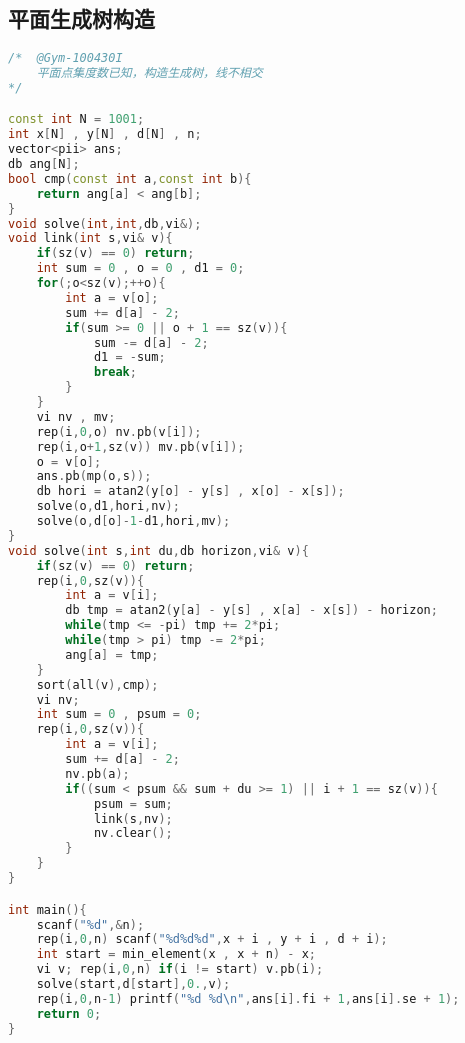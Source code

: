 \subsection{平面生成树构造}
\begin{lstlisting}[language=C++]
/*	@Gym-100430I
	平面点集度数已知，构造生成树，线不相交
*/

const int N = 1001;
int x[N] , y[N] , d[N] , n;
vector<pii> ans;
db ang[N];
bool cmp(const int a,const int b){
	return ang[a] < ang[b];
}
void solve(int,int,db,vi&);
void link(int s,vi& v){
	if(sz(v) == 0) return;
	int sum = 0 , o = 0 , d1 = 0;
	for(;o<sz(v);++o){
		int a = v[o];
		sum += d[a] - 2;
		if(sum >= 0 || o + 1 == sz(v)){
			sum -= d[a] - 2;
			d1 = -sum;
			break;
		}
	}
	vi nv , mv;
	rep(i,0,o) nv.pb(v[i]);
	rep(i,o+1,sz(v)) mv.pb(v[i]);
	o = v[o];
	ans.pb(mp(o,s));
	db hori = atan2(y[o] - y[s] , x[o] - x[s]);
	solve(o,d1,hori,nv);
	solve(o,d[o]-1-d1,hori,mv);
}
void solve(int s,int du,db horizon,vi& v){
	if(sz(v) == 0) return;
	rep(i,0,sz(v)){
		int a = v[i];
		db tmp = atan2(y[a] - y[s] , x[a] - x[s]) - horizon;
		while(tmp <= -pi) tmp += 2*pi;
		while(tmp > pi) tmp -= 2*pi;
		ang[a] = tmp;
	}
	sort(all(v),cmp);
	vi nv;
	int sum = 0 , psum = 0;
	rep(i,0,sz(v)){
		int a = v[i];
		sum += d[a] - 2;
		nv.pb(a);
		if((sum < psum && sum + du >= 1) || i + 1 == sz(v)){
			psum = sum;
			link(s,nv);
			nv.clear();
		}
	}
}

int main(){
	scanf("%d",&n);
	rep(i,0,n) scanf("%d%d%d",x + i , y + i , d + i);
	int start = min_element(x , x + n) - x;
	vi v; rep(i,0,n) if(i != start) v.pb(i);
	solve(start,d[start],0.,v);
	rep(i,0,n-1) printf("%d %d\n",ans[i].fi + 1,ans[i].se + 1);
	return 0;
}
\end{lstlisting}
